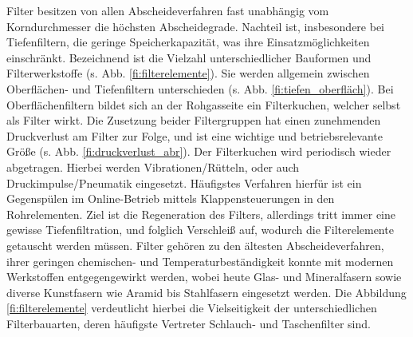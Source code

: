 Filter besitzen von allen Abscheideverfahren fast unabhängig vom Korndurchmesser die höchsten Abscheidegrade. Nachteil ist, insbesondere bei Tiefenfiltern, die geringe Speicherkapazität, was ihre Einsatzmöglichkeiten einschränkt. Bezeichnend ist die Vielzahl unterschiedlicher Bauformen und Filterwerkstoffe (s. Abb. \ref{fi:filterelemente}). Sie werden allgemein zwischen Oberflächen- und Tiefenfiltern unterschieden (s. Abb. \ref{fi:tiefen_oberfläch}). Bei Oberflächenfiltern bildet sich an der Rohgasseite ein Filterkuchen, welcher selbst als Filter wirkt. Die Zusetzung beider Filtergruppen hat einen zunehmenden Druckverlust am Filter zur Folge, und ist eine wichtige und betriebsrelevante Größe (s. Abb. \ref{fi:druckverlust_abr}). Der Filterkuchen wird periodisch wieder abgetragen. Hierbei werden Vibrationen/Rütteln, oder auch Druckimpulse/Pneumatik eingesetzt. Häufigstes Verfahren hierfür ist ein Gegenspülen im Online-Betrieb mittels Klappensteuerungen in den Rohrelementen.\cite{Staubabscheidung} Ziel ist die Regeneration des Filters, allerdings tritt immer eine gewisse Tiefenfiltration, und folglich Verschleiß auf, wodurch die Filterelemente getauscht werden müssen. Filter gehören zu den ältesten Abscheideverfahren, ihrer geringen chemischen- und Temperaturbeständigkeit konnte mit modernen Werkstoffen entgegengewirkt werden, wobei heute Glas- und Mineralfasern sowie diverse Kunstfasern wie Aramid bis Stahlfasern eingesetzt werden. Die Abbildung \ref{fi:filterelemente} verdeutlicht hierbei die Vielseitigkeit der unterschiedlichen Filterbauarten, deren häufigste Vertreter Schlauch- und Taschenfilter sind. \cite{immission}
